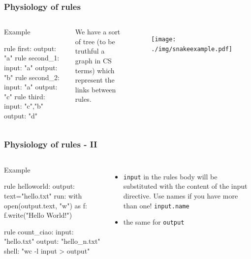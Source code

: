 \documentclass[xcolor=table]{beamer}
\begin{document}
\begin{frame}[fragile]
\frametitle{Physiology of rules}
\begin{columns}[c]
\begin{beamerboxesrounded}[upper=upper_box2,lower=lower_box,shadow=true]{Example}
\begin{python}
rule first:
    output: "a"
rule second_1:
    input: "a"
    output: "b"
rule second_2:
    input: "a"
    output: "c"
rule third:
    input: "c","b"
    output: "d"
\end{python}
\end{beamerboxesrounded}
We have a sort of \textcolor{galon}{tree} (to be truthful a \textcolor{beer}{graph} in CS terms) which represent
the links between rules.
\begin{figure}\texttt{[image: ./img/snakeexample.pdf]}\end{figure}
\end{columns}
\end{frame}


\begin{frame}[fragile]
\frametitle{Physiology of rules - II}
\begin{columns}[c]
\begin{beamerboxesrounded}[upper=upper_box2,lower=lower_box,shadow=true]{Example}
\begin{python}
rule helloworld:
    output: text="hello.txt"
    run:
        with open(output.text, "w") as f:
            f.write("Hello World!\n")

rule count_ciao:
    input: "hello.txt"
    output: "hello_n.txt"
    shell: "wc -l {input} > {output}"

\end{python}
\end{beamerboxesrounded}
\begin{itemize}
\item \texttt{input} in the rules body will be substituted with the content of the input directive. Use names if you have more than one! \texttt{input.name}
\item the same for \texttt{output}
\end{itemize}
\end{columns}
\end{frame}
\end{document}
